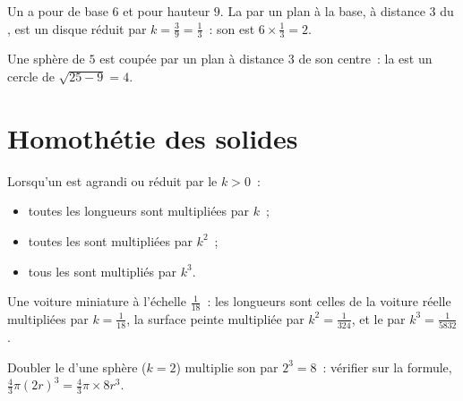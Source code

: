 \begin{example}\label{ex:g9:solids:section}
Un  a pour  de base $6$ et pour hauteur $9$. La  par un
plan  à la base, à distance $3$ du , est un disque réduit
par $k = \frac39 = \frac13$~: son  est $6 \times \frac13 = 2$.

Une sphère de  $5$ est coupée par un plan à distance $3$ de son
centre~: la  est un cercle de  $\sqrt{25 - 9} = 4$.
\end{example}

\section{Homothétie des solides}

\begin{theorem}\label{thm:g9:solids:scaling}
Lorsqu'un  est agrandi ou réduit par le 
$k > 0$~:
\begin{itemize}
  \item toutes les longueurs sont multipliées par $k$~;
  \item toutes les  sont multipliées par $k^2$~;
  \item tous les  sont multipliés par $k^3$.
\end{itemize}
\end{theorem}
\admitted

\begin{example}\label{ex:g9:solids:scaling}
Une voiture miniature à l'échelle $\frac{1}{18}$~: les longueurs sont
celles de la voiture réelle multipliées par $k = \frac{1}{18}$, la
surface peinte multipliée par $k^2 = \frac{1}{324}$, et le  par
$k^3 = \frac{1}{5832}$.

Doubler le  d'une sphère ($k = 2$) multiplie son  par
$2^3 = 8$~: vérifier sur la formule,
$\frac43\pi (2r)^3 = \frac43 \pi \times 8r^3$.
\end{example}

